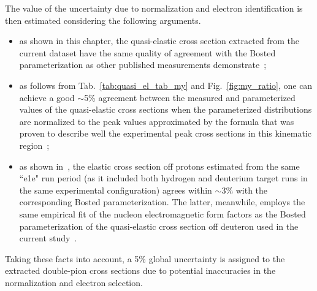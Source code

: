 The value of the uncertainty due to normalization and electron identification is then estimated considering the following arguments.
\begin{itemize}
\item as shown in this chapter, the quasi-elastic cross section extracted from the current dataset have the same quality of agreement with the Bosted parameterization as other published measurements demonstrate~\cite{note_QE_peak};
\item as follows from Tab.~\ref{tab:quasi_el_tab_my} and Fig.~\ref{fig:my_ratio}, one can achieve a good $\sim$5\% agreement between the measured and parameterized values of the quasi-elastic cross sections when the parameterized distributions are normalized to the peak values approximated by the formula that was proven to describe well the experimental peak cross sections in this kinematic region~\cite{note_QE_peak};
\item as shown in~\cite{Fed_an_note:2017,Fed_paper_2018}, the elastic cross section off protons estimated from the same ``e1e" run period (as it included both hydrogen and deuterium target runs in the same experimental configuration) agrees within $\sim$3\% with the corresponding Bosted parameterization. The latter, meanwhile, employs the same empirical fit of the nucleon electromagnetic form factors as the Bosted parameterization of the quasi-elastic cross section off deuteron used in the current study~\cite{Bosted:1994tm}.  
\end{itemize}


Taking these facts into account, a 5\% global uncertainty is assigned to the extracted double-pion cross sections due to potential inaccuracies in the normalization and electron selection.


